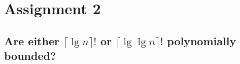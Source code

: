 \chapter{Assignment 2}

\section[Problem 1]{Are either $\lceil \lg n \rceil!$ or $\lceil \lg \lg n \rceil!$ polynomially bounded?}


\section[Problem 2]{}
